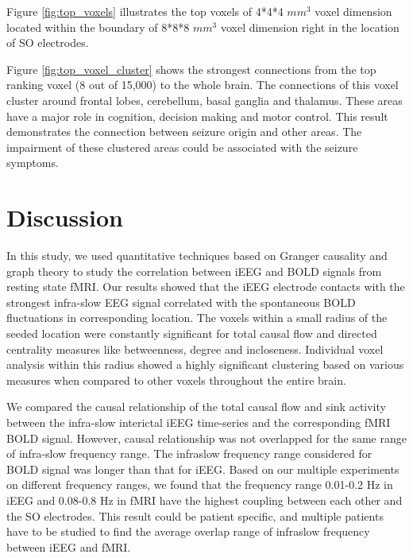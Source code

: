 Figure \ref{fig:top_voxels} illustrates the top voxels of 4*4*4 $mm^3$ voxel dimension located within the boundary of 8*8*8 $mm^3$ voxel dimension right in the location of SO electrodes. 


Figure \ref{fig:top_voxel_cluster} shows the strongest connections from the top ranking voxel (8 out of 15,000) to the whole brain. The connections of this voxel cluster around frontal lobes, cerebellum, basal ganglia and thalamus. These areas have a major role in cognition, decision making and motor control. This result demonstrates the connection between seizure origin and other areas. The impairment of these clustered areas could be associated with the seizure symptoms.


\section{Discussion}
\label{sec:discussion}
In this study, we used quantitative techniques based on Granger causality and graph theory to study the correlation between iEEG and BOLD signals from resting state fMRI. Our results showed that the iEEG electrode contacts with the strongest infra-slow EEG signal correlated with the spontaneous BOLD fluctuations in corresponding location. The voxels within a small radius of the seeded location were constantly significant for total causal flow and directed centrality measures like betweenness, degree and incloseness. Individual voxel analysis within this radius showed a highly significant clustering based on various measures when compared to other voxels throughout the entire brain.

We compared the causal relationship of the total causal flow and sink activity between the infra-slow interictal iEEG time-series and the corresponding fMRI BOLD signal. However, causal relationship was not overlapped for the same range of infra-slow frequency range. The infraslow frequency range considered for BOLD signal was longer than that for iEEG. Based on our multiple experiments on different frequency ranges, we found that the frequency range 0.01-0.2 Hz in iEEG and 0.08-0.8 Hz in fMRI have the highest coupling between each other and the SO electrodes. This result could be patient specific, and multiple patients have to be studied to find the average overlap range of infraslow frequency between iEEG and fMRI.

